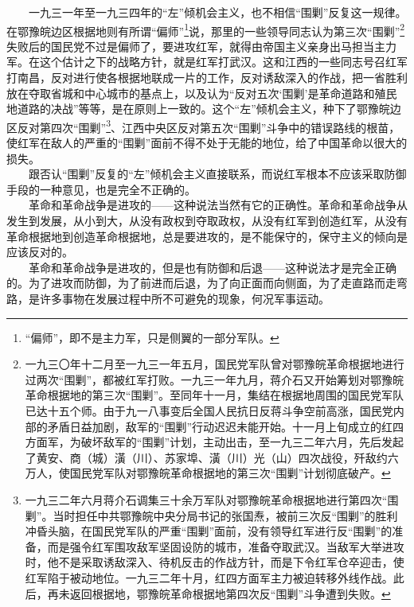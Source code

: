 \documentclass[cn,11pt,chinese]{elegantbook}
\begin{document}
　　一九三一年至一九三四年的“左”倾机会主义，也不相信“围剿”反复这一规律。在鄂豫皖边区根据地则有所谓“偏师”\footnote[19]{ “偏师”，即不是主力军，只是侧翼的一部分军队。}说，那里的一些领导同志认为第三次“围剿”\footnote[20]{ 一九三〇年十二月至一九三一年五月，国民党军队曾对鄂豫皖革命根据地进行过两次“围剿”，都被红军打败。一九三一年九月，蒋介石又开始筹划对鄂豫皖革命根据地的第三次“围剿”。至同年十一月，集结在根据地周围的国民党军队已达十五个师。由于九一八事变后全国人民抗日反蒋斗争空前高涨，国民党内部的矛盾日益加剧，敌军的“围剿”行动迟迟未能开始。十一月上旬成立的红四方面军，为破坏敌军的“围剿”计划，主动出击，至一九三二年六月，先后发起了黄安、商（城）潢（川）、苏家埠、潢（川）光（山）四次战役，歼敌约六万人，使国民党军队对鄂豫皖革命根据地的第三次“围剿”计划彻底破产。}失败后的国民党不过是偏师了，要进攻红军，就得由帝国主义亲身出马担当主力军。在这个估计之下的战略方针，就是红军打武汉。这和江西的一些同志号召红军打南昌，反对进行使各根据地联成一片的工作，反对诱敌深入的作战，把一省胜利放在夺取省城和中心城市的基点上，以及认为“反对五次‘围剿’是革命道路和殖民地道路的决战”等等，是在原则上一致的。这个“左”倾机会主义，种下了鄂豫皖边区反对第四次“围剿”\footnote[21]{ 一九三二年六月蒋介石调集三十余万军队对鄂豫皖革命根据地进行第四次“围剿”。当时担任中共鄂豫皖中央分局书记的张国焘，被前三次反“围剿”的胜利冲昏头脑，在国民党军队的严重“围剿”面前，没有领导红军进行反“围剿”的准备，而是强令红军围攻敌军坚固设防的城市，准备夺取武汉。当敌军大举进攻时，他不是采取诱敌深入、待机反击的作战方针，而是下令红军仓卒迎击，使红军陷于被动地位。一九三二年十月，红四方面军主力被迫转移外线作战。此后，再未返回根据地，鄂豫皖革命根据地第四次反“围剿”斗争遭到失败。}、江西中央区反对第五次“围剿”斗争中的错误路线的根苗，使红军在敌人的严重的“围剿”面前不得不处于无能的地位，给了中国革命以很大的损失。\\
　　跟否认“围剿”反复的“左”倾机会主义直接联系，而说红军根本不应该采取防御手段的一种意见，也是完全不正确的。\\
　　革命和革命战争是进攻的——这种说法当然有它的正确性。革命和革命战争从发生到发展，从小到大，从没有政权到夺取政权，从没有红军到创造红军，从没有革命根据地到创造革命根据地，总是要进攻的，是不能保守的，保守主义的倾向是应该反对的。\\
　　革命和革命战争是进攻的，但是也有防御和后退——这种说法才是完全正确的。为了进攻而防御，为了前进而后退，为了向正面而向侧面，为了走直路而走弯路，是许多事物在发展过程中所不可避免的现象，何况军事运动。\\
\end{document}
